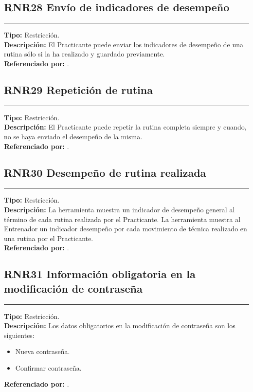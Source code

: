 \subsection{\normalsize{\textcolor[rgb]{0, 0, 0.545098}{RNR28 Envío de indicadores de desempeño}}}
\label{rn:RNR28}
\rule[3mm]{16.59cm}{0.1mm} \vspace{1mm}
\textbf{Tipo:} Restricción.\\
\textbf{Descripción:} El Practicante puede enviar los indicadores de desempeño de una rutina sólo si la ha realizado y guardado previamente.\\
\textbf{Referenciado por: }  .\\

\subsection{\normalsize{\textcolor[rgb]{0, 0, 0.545098}{RNR29 Repetición de rutina}}}
\label{rn:RNR29}
\rule[3mm]{16.59cm}{0.1mm} \vspace{1mm}
\textbf{Tipo:} Restricción.\\
\textbf{Descripción:} El Practicante puede repetir la rutina completa siempre y cuando, no se haya enviado el desempeño de la misma.\\
\textbf{Referenciado por: }  .\\

\subsection{\normalsize{\textcolor[rgb]{0, 0, 0.545098}{RNR30 Desempeño de rutina realizada}}}
\label{rn:RNR30}
\rule[3mm]{16.59cm}{0.1mm} \vspace{1mm}
\textbf{Tipo:} Restricción.\\
\textbf{Descripción:} La herramienta muestra un indicador de desempeño general al término de cada rutina realizada por el Practicante. La herramienta muestra al Entrenador un indicador desempeño por cada movimiento de técnica realizado en una rutina por el Practicante.\\
\textbf{Referenciado por: }  .\\

\subsection{\normalsize{\textcolor[rgb]{0, 0, 0.545098}{RNR31 Información obligatoria en la modificación de contraseña}}}
\label{rn:RNR31}
\rule[3mm]{16.59cm}{0.1mm} \vspace{1mm}
\textbf{Tipo:} Restricción.\\
\textbf{Descripción:} Los datos obligatorios en la modificación de contraseña son los siguientes:
\begin{itemize} \itemsep1pt \parskip0pt 
	\item Nueva contraseña.
	\item Confirmar contraseña.
\end{itemize}
\textbf{Referenciado por: }  .\\

